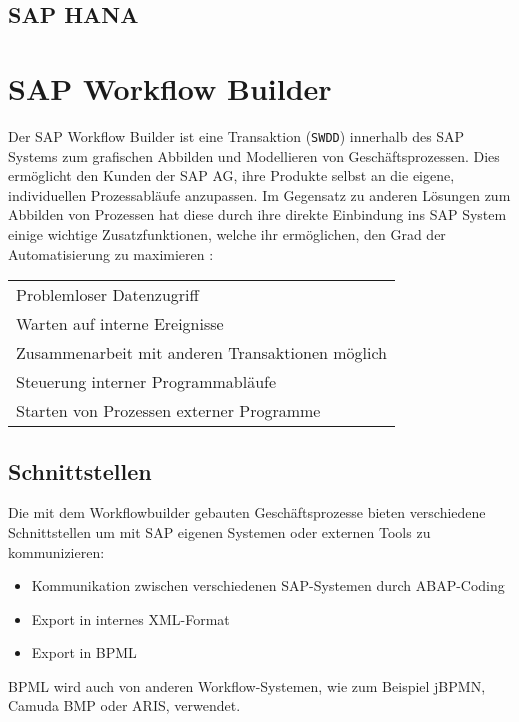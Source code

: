 \documentclass{handout}
\begin{document}
\subsection{SAP HANA}

\newpage

\section{SAP Workflow Builder}
Der SAP Workflow Builder ist eine Transaktion (\texttt{SWDD}) innerhalb des SAP Systems zum grafischen Abbilden und Modellieren von Geschäftsprozessen. Dies ermöglicht den Kunden der SAP AG, ihre Produkte selbst an die eigene, individuellen Prozessabläufe anzupassen. Im Gegensatz zu anderen Lösungen zum Abbilden von Prozessen hat diese durch ihre direkte Einbindung ins SAP System einige wichtige Zusatzfunktionen, welche ihr ermöglichen, den Grad der Automatisierung zu maximieren \cite{SAPHelpWf}:

\small
\begin{tabular}{L}
Problemloser Datenzugriff\\
Warten auf interne Ereignisse\\
Zusammenarbeit mit anderen Transaktionen möglich\\
Steuerung interner Programmabläufe\\
Starten von Prozessen externer Programme
\end{tabular}
\normalsize


\newpage

\subsection{Schnittstellen}

Die mit dem Workflowbuilder gebauten Geschäftsprozesse bieten verschiedene Schnittstellen um mit SAP eigenen Systemen oder externen Tools zu kommunizieren:

\begin{itemize}
\item Kommunikation zwischen verschiedenen SAP-Systemen durch ABAP-Coding
\item Export in internes XML-Format
\item Export in BPML
\end{itemize}

BPML wird auch von anderen Workflow-Systemen, wie zum Beispiel jBPMN, Camuda BMP oder ARIS, verwendet.
\end{document}
